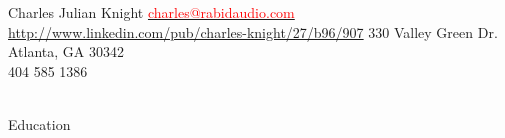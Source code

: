 \documentclass[a4paper,12pt]{article}
\begin{document}
\oddsidemargin=-1cm
\setmainfont

\header
{\LARGE{Charles Julian Knight}}
{{\hspace{.08in}\small \href{mailto:charles@rabidaudio.com}{\textcolor{red}{charles@rabidaudio.com}}}\\
\hspace{0in} \scriptsize \url{http://www.linkedin.com/pub/charles-knight/27/b96/907}}
{330 Valley Green Dr.\\Atlanta, GA 30342\\
{404 585 1386}\\ %
}\\



\begin{resumeblock}{Education}
\largeskip \largeskip
{}
\largeskip

\end{resumeblock}

\end{document}
